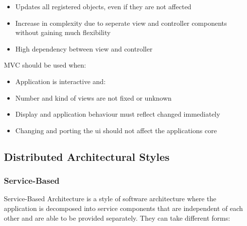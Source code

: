 \documentclass[
../../Software_Engineering_Summary.tex,
]
{subfiles}
\begin{document}
\begin{defbox}
    \begin{itemize}
        \item Updates all registered objects, even if they are not affected
        \item Increase in complexity due to seperate view and controller components without gaining much flexibility
        \item High dependency between view and controller
    \end{itemize}
\end{defbox}

MVC should be used when:
\begin{itemize}
    \item Application is interactive and:
    \item Number and kind of views are not fixed or unknown
    \item Display and application behaviour must reflect changed immediately
    \item Changing and porting the ui should not affect the applications core
\end{itemize}

\subsection{Distributed Architectural Styles}
\subsubsection{Service-Based}
Service-Based Architecture is a style of software architecture where the application is decomposed into service components that are independent of each other and are able to be provided separately. They can take different forms:
\end{document}
